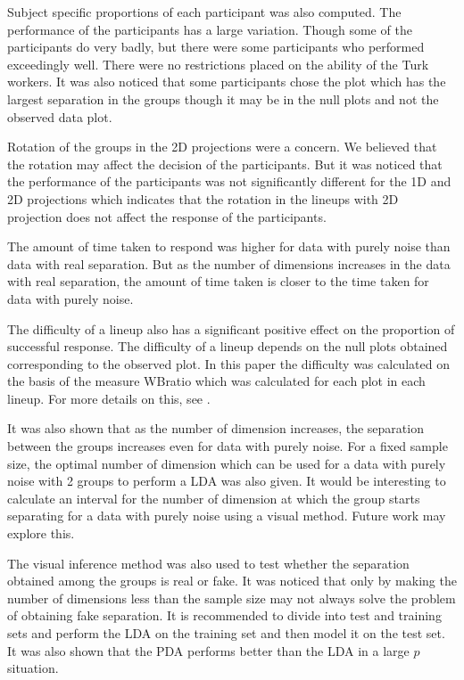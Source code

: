 \documentclass[12]{article}
\begin{document}
Subject specific proportions of each participant was also computed. The performance of the participants has a large variation. Though some of the participants do very badly, but there were some participants who performed exceedingly well. There were no restrictions  placed on the ability of the Turk workers. It was also noticed that some participants chose the plot which has the largest separation in the groups though it may be in the null plots and not the observed data plot.

Rotation of the groups in the 2D projections were a concern. We believed that the rotation may affect the decision of the participants. But it was noticed that the performance of the participants was not significantly different for the 1D and 2D projections which indicates that the rotation in the lineups with 2D projection does not affect the response of the participants. 

The amount of time taken to respond was higher for data with purely noise than data with real separation. But as the number of dimensions increases in the data with real separation, the amount of time taken is closer to the time taken for data with purely noise.

The difficulty of a lineup also has a significant positive effect on the proportion of successful response. The difficulty of a lineup depends on the null plots obtained corresponding to the observed plot. In this paper the difficulty was calculated on the basis of the measure WBratio which was calculated for each plot in each lineup. For more details on this, see \cite{roychowdhury:2012}.
 
It was also shown that as the number of dimension increases, the separation between the groups increases even for data with purely noise. For a fixed sample size, the optimal number of dimension which can be used for a data with purely noise with 2 groups to perform a LDA was also given. It would be interesting to calculate an interval for the number of dimension at which the group starts separating for a data with purely noise using a visual method. Future work may explore this.

The visual inference method was also used to test whether the separation obtained among the groups is real or fake. It was noticed that only by making the number of dimensions less than the sample size may not always solve the problem of obtaining fake separation. It is recommended to divide into test and training sets and perform the LDA on the training set and then model it on the test set. It was also shown that the PDA performs better than the LDA in a large $p$ situation.
\end{document}
